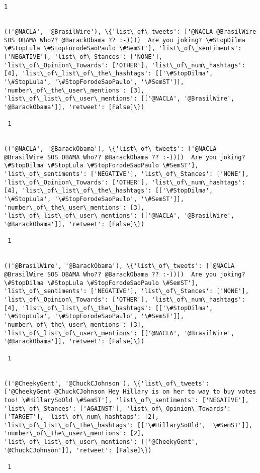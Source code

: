 \documentclass[11pt]{article}
\begin{document}
\begin{Verbatim}[commandchars=\\\{\}]
 1
 

(('@NACLA', '@BrasilWire'), \{'list\_of\_tweets': ['@NACLA @BrasilWire SOS OBAMA Who?? @BarackObama ?? :-))))  Are you joking? \#StopDilma \#StopLula \#StopForodeSaoPaulo \#SemST'], 'list\_of\_sentiments': ['NEGATIVE'], 'list\_of\_Stances': ['NONE'], 'list\_of\_Opinion\_Towards': ['OTHER'], 'list\_of\_num\_hashtags': [4], 'list\_of\_list\_of\_the\_hashtags': [['\#StopDilma', '\#StopLula', '\#StopForodeSaoPaulo', '\#SemST']], 'number\_of\_the\_user\_mentions': [3], 'list\_of\_list\_of\_user\_mentions': [['@NACLA', '@BrasilWire', '@BarackObama']], 'retweet': [False]\})

 1
 

(('@NACLA', '@BarackObama'), \{'list\_of\_tweets': ['@NACLA @BrasilWire SOS OBAMA Who?? @BarackObama ?? :-))))  Are you joking? \#StopDilma \#StopLula \#StopForodeSaoPaulo \#SemST'], 'list\_of\_sentiments': ['NEGATIVE'], 'list\_of\_Stances': ['NONE'], 'list\_of\_Opinion\_Towards': ['OTHER'], 'list\_of\_num\_hashtags': [4], 'list\_of\_list\_of\_the\_hashtags': [['\#StopDilma', '\#StopLula', '\#StopForodeSaoPaulo', '\#SemST']], 'number\_of\_the\_user\_mentions': [3], 'list\_of\_list\_of\_user\_mentions': [['@NACLA', '@BrasilWire', '@BarackObama']], 'retweet': [False]\})

 1
 

(('@BrasilWire', '@BarackObama'), \{'list\_of\_tweets': ['@NACLA @BrasilWire SOS OBAMA Who?? @BarackObama ?? :-))))  Are you joking? \#StopDilma \#StopLula \#StopForodeSaoPaulo \#SemST'], 'list\_of\_sentiments': ['NEGATIVE'], 'list\_of\_Stances': ['NONE'], 'list\_of\_Opinion\_Towards': ['OTHER'], 'list\_of\_num\_hashtags': [4], 'list\_of\_list\_of\_the\_hashtags': [['\#StopDilma', '\#StopLula', '\#StopForodeSaoPaulo', '\#SemST']], 'number\_of\_the\_user\_mentions': [3], 'list\_of\_list\_of\_user\_mentions': [['@NACLA', '@BrasilWire', '@BarackObama']], 'retweet': [False]\})

 1
 

(('@CheekyGent', '@ChuckCJohnson'), \{'list\_of\_tweets': ['@CheekyGent @ChuckCJohnson Hey Hillary is on her to way to buy votes too! \#HillarySoOld \#SemST'], 'list\_of\_sentiments': ['NEGATIVE'], 'list\_of\_Stances': ['AGAINST'], 'list\_of\_Opinion\_Towards': ['TARGET'], 'list\_of\_num\_hashtags': [2], 'list\_of\_list\_of\_the\_hashtags': [['\#HillarySoOld', '\#SemST']], 'number\_of\_the\_user\_mentions': [2], 'list\_of\_list\_of\_user\_mentions': [['@CheekyGent', '@ChuckCJohnson']], 'retweet': [False]\})

 1
 


\end{Verbatim}
\end{document}
